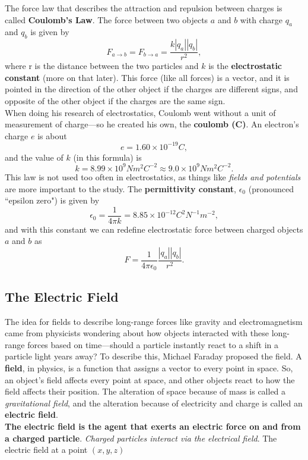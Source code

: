 \documentclass[12pt,letterpaper]{article}
\begin{document}
The force law that describes the attraction and repulsion between charges is called \textbf{Coulomb's Law}. The force between two objects $a$ and $b$ with charge $q_{a}$ and $q_{b}$ is given by $$F_{a \rightarrow b} = F_{b \rightarrow a} = \frac{k |q_{a}| |q_{b}|}{r^{2}},$$ where r is the distance between the two particles and $k$ is the \textbf{electrostatic constant} (more on that later). This force (like all forces) is a vector, and it is pointed in the direction of the other object if the charges are different signs, and opposite of the other object if the charges are the same sign. \\

When doing his research of electrostatics, Coulomb went without a unit of measurement of charge---so he created his own, the \textbf{coulomb (C)}. An electron's charge $e$ is about $$e = 1.60 \times 10^{-19} C,$$ and the value of $k$ (in this formula) is $$k = 8.99 \times 10^{9} N m^{2} C^{-2} \approx 9.0 \times 10^{9} N m^{2} C^{-2}.$$ This law is not used too often in electrostatics, as things like \textit{fields and potentials} are more important to the study. The \textbf{permittivity constant}, $\epsilon_{0}$ (pronounced ``epsilon zero") is given by $$\epsilon_{0} = \frac{1}{4\pi k} = 8.85 \times 10^{-12} C^{2} N^{-1} m^{-2},$$ and with this constant we can redefine electrostatic force between charged objects $a$ and $b$ as $$F = \frac{1}{4\pi\epsilon_{0}} \frac{|q_{a}| |q_{b}|}{r^{2}}.$$

\subsection{The Electric Field}

The idea for fields to describe long-range forces like gravity and electromagnetism came from physicists wondering about how objects interacted with these long-range forces based on time---should a particle instantly react to a shift in a particle light years away? To describe this, Michael Faraday proposed the field. A \textbf{field}, in physics, is a function that assigns a vector to every point in space. So, an object's field affects every point at space, and other objects react to how the field affects their position. The alteration of space because of mass is called a \textit{gravitational field}, and the alteration because of electricity and charge is called an \textbf{electric field}. \\

\textbf{The electric field is the agent that exerts an electric force on and from a charged particle}. \textit{Charged particles interact via the electrical field}. The electric field at a point $(x, y, z)$ 
\end{document}
